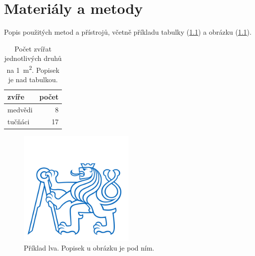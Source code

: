 \chapter{Materiály a metody}
\label{sec:metody}

\noindent Popis použitých metod a přístrojů, včetně příkladu tabulky  (\ref{tab:priklad}) a obrázku (\ref{fig:priklad}).

\begin{table}[hbtp]
    \centering
    \caption{Počet zvířat jednotlivých druhů na \SI{1}{\meter\squared}. Popisek je nad tabulkou.}
    \begin{tabular}{|l|r|}\hline
        zvíře & počet \\ \hline\hline
        medvědi & 8\\
        tučňáci & 17\\\hline
    \end{tabular}
    \label{tab:priklad}
\end{table}

\begin{figure}[hbtp]
    \centering
    \includegraphics[width=0.5\textwidth]{cvut.jpg}
    \caption{Příklad lva. Popisek u obrázku je pod ním.}
    \label{fig:priklad}
\end{figure}


